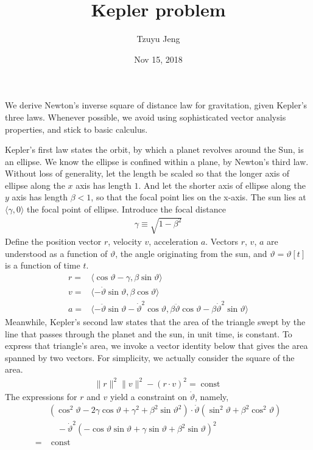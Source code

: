 \documentclass{article}
\title{Kepler problem}
\author{Tzuyu Jeng}
\date{Nov 15, 2018}
\renewcommand{\S}{\sqrt}
\newcommand{\Gb}{\beta}
\newcommand{\Gg}{\gamma}
\newcommand{\Gq}{\vartheta}
\newcommand{\La}{\langle}
\newcommand{\Ra}{\rangle}
\newcommand{\Bd}{\cdot}
\newcommand{\Ed}{\equiv}
\newcommand{\Xqd}{\dot{\vartheta}}
\newcommand{\Xqdd}{\ddot{\vartheta}}
\newcommand{\Xs}{\sin \vartheta}
\newcommand{\Xc}{\cos \vartheta}
\newcommand{\Xss}{\sin^2 \vartheta}
\newcommand{\Xcc}{\cos^2 \vartheta}
\newcommand{\Tct}{\;\mathrm{const}\;}
\begin{document}
\maketitle

We derive Newton's inverse square of distance law for gravitation, given Kepler's three laws.
Whenever possible, we avoid using sophisticated vector analysis properties, and stick to basic calculus.

Kepler's first law states the orbit, by which a planet revolves around the Sun, is an ellipse.
We know the ellipse is confined within a plane, by Newton's third law.
Without loss of generality, let the length be scaled so that the longer axis of ellipse along the \(x\) axis has length \(1\).
And let the shorter axis of ellipse along the \(y\) axis has length \(\beta <1\), so that the focal point lies on the x-axis.
The sun lies at \(\La \Gg, 0 \Ra\) the focal point of ellipse.
Introduce the focal distance
\begin{align}
\Gg \Ed \S{1 - \Gb^2}
\end{align}
Define the position vector \(r\), velocity \(v\), acceleration \(a\).
Vectors \(r\), \(v\), \(a\) are understood as a function of \(\Gq\), the angle originating from the sun, and \(\Gq= \Gq[t]\) is a function of time \(t\).
\begin{align}
r = &\La \Xc - \Gg, \Gb \Xs \Ra \\
v = &\La - \Xqd \Xs, \Gb \Xc \Ra \\
a = &\La -\Xqdd \Xs -\Xqd ^2 \Xc,
\Gb \Xqdd \Xc -\Gb \Xqd^2 \Xs \Ra
\end{align}
Meanwhile, Kepler's second law states that the area of the triangle swept by the line that passes through the planet and the sun, in unit time, is constant.
To express that triangle's area, we invoke a
vector identity below that gives the area spanned by two vectors.
For simplicity, we actually consider the square of the area.
\begin{align}
\| r \| ^2 \| v \| ^2 - (r \Bd v) ^2 = \Tct
\end{align}
The expressions for \(r\) and \(v\) yield a constraint on \(\Xqd\), namely,
\begin{align}
&(\Xcc - 2 \Gg \Xc + \Gg^2 + \Gb^2 \Xs^2)
\Bd \Xqd (\Xss + \Gb^2 \Xcc) \\
&\quad - \Xqd^2 (-\Xc \Xs + \Gg \Xs + \Gb^2 \Xs)^2 \\
= &\Tct
\end{align}
\end{document}
